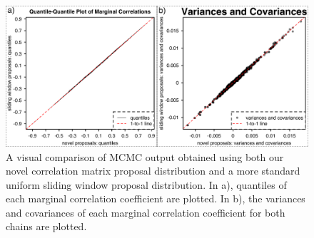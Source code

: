 \begin{figure}[h]
\centering
\includegraphics[width=160mm]{figures/app_corrs_2methods.pdf}
\caption[Sampling from the Posterior with a Novel Proposal Distribution]{A visual comparison of MCMC output obtained using both our novel correlation matrix proposal distribution and a more standard uniform sliding window proposal distribution. In a), quantiles of each marginal correlation coefficient are plotted. In b), the variances and covariances of each marginal correlation coefficient for both chains are plotted.
\label{fig:posteriorSamplingResults} 
\label{overflow}}
\end{figure}